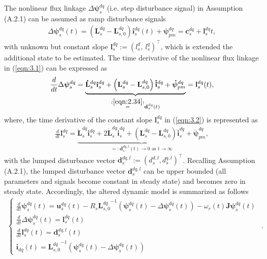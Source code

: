 The nonlinear flux linkage \(\Delta\boldsymbol{\psi}^{dq}_s\) (i.e. step disturbance signal) in Assumption (A.2.1) can be assumed as ramp disturbance signals
\begin{equation}\label{eqn:3.1}
\begin{aligned}
    \Delta\boldsymbol{\psi}^{dq}_s(t) = \left( \mathbf{L}^{dq}_{s} - \mathbf{L}^{dq}_{s,0} \right) \mathbf{i}^{dq}_s(t) + \boldsymbol{\psi}^{dq}_{pm} = \mathbf{c}^{dq}_s + \mathbf{l}^{dq}_s t,
\end{aligned}
\end{equation}
with unknown but constant slope \(\mathbf{l}^{dq}_s := (l^d_s,\ l^q_s)^\top\), which is extended the additional state to be estimated. The time derivative of the nonlinear flux linkage in (\ref{eqn:3.1}) can be expressed as 
\begin{align}\label{eqn:3.2}
\frac{d}{dt}\Delta{\boldsymbol{\psi}^{dq}_s} = \underbrace{\mathbf{\dot L}^{dq}_{s} \mathbf{i}^{dq}_s + \left( \mathbf{L}^{dq}_{s} - \mathbf{L}^{dq}_{s,0} \right) \mathbf{\dot i}^{dq}_s + \boldsymbol{\dot \psi}^{dq}_{pm}}_{\stackrel{(\ref{eqn:2.34})}= \mathbf{d}^{dq}_s(t)} = \mathbf{l}^{dq}_s(t),
\end{align}  
where, the time derivative of the constant slope $\mathbf{l}^{dq}_s$ in (\ref{eqn:3.2}) is represented as 
\begin{align}\label{eqn:3.3}
\frac{d}{dt}{\mathbf{l}^{dq}_s} = \underbrace{\mathbf{\ddot L}^{dq}_{s}\mathbf{i}^{dq}_s+2\mathbf{\dot L}^{dq}_{s} \dot{\mathbf{i}}^{dq}_s + \left( \mathbf{L}^{dq}_{s} - \mathbf{L}^{dq}_{s,0} \right) \mathbf{\ddot i}^{dq}_s + \boldsymbol{\ddot \psi}^{dq}_{pm}}_{=:  \mathbf{d}^{dq,l}_s(t) \rightarrow  0 \text{ as t} \rightarrow \infty},
\end{align}  
with the lumped disturbance vector $\mathbf{d}^{dq,l}_s:=(d^{d,l}_s,d^{q,l}_s)^\top$. Recalling Assumption (A.2.1), the lumped disturbance vector \(\mathbf{d}^{dq,l}_s\) can be upper bounded (all parameters and signals become constant in steady state) and becomes zero in steady state. Accordingly, the altered dynamic model is summarized as follows
\begin{equation}
\begin{aligned}\label{eqn:3.4_1}
\begin{cases}
\frac{d}{dt}{\bm{\psi}}^{dq}_s(t) = \mathbf{u}^{dq}_s(t) - R_s {\mathbf{L}^{dq}_{s,0}}^{-1} \left( \bm{\psi}^{dq}_s(t) - \Delta{\boldsymbol{\psi}^{dq}_s}(t) \right) - \omega_r(t) \mathbf{J} \bm{\psi}^{dq}_s(t) \\
\frac{d}{dt}{\Delta}{\boldsymbol{\psi}^{dq}_s}(t) = \mathbf{l}^{dq}_s(t) \\
\frac{d}{dt}{\boldsymbol{l}^{dq}_s}(t) = \mathbf{d}^{dq,l}_s(t) \\
\mathbf{i}_{dq}(t) = {\mathbf{L}^{dq}_{s,0}}^{-1} \left( \bm{\psi}^{dq}_s(t) - \Delta{\boldsymbol{\psi}^{dq}_s}(t) \right)
\end{cases}
\end{aligned}.
\end{equation}
